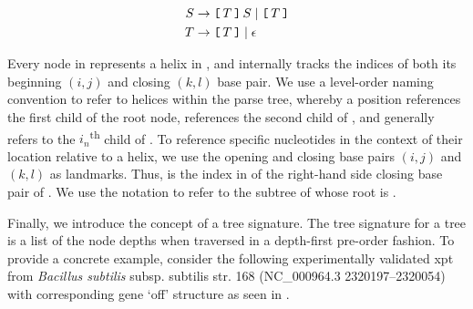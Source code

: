 \begin{align}
\label{eq:rfinder:shapeCfg}
\begin{split}
S &\rightarrow \brL T \brR\, S \;|\; \brL T \brR \\
T &\rightarrow \brL T \brR \;|\; \epsilon \\
\end{split}
\end{align}

Every node in \tree
represents a helix in \strS, and internally tracks the indices of both its
beginning $(i,j)$ and closing $(k,l)$ base pair. We use a level-order naming
convention to refer to helices within the parse tree, whereby a position
 references the first child of the root node, 
references the second child of , and generally
 refers to the $i_n$\textsuperscript{th} child of
. To reference specific nucleotides in the
context of their location relative to a helix, we use the opening and closing base
pairs $(i,j)$ and $(k,l)$ as landmarks. Thus,  is the index in
\strS of the right-hand side closing base pair of . We use the
notation  to refer to the subtree of \tree whose root is
.

Finally, we introduce the concept of a tree signature. The tree signature for a
tree \tree is a list of the node depths when traversed in a depth-first pre-order
fashion. To provide a concrete example, consider the following experimentally
validated xpt \grb from {\em Bacillus subtilis} subsp. subtilis str. 168
(NC\_000964.3 2320197--2320054) with corresponding gene `off' structure as seen in
.
\medskip

